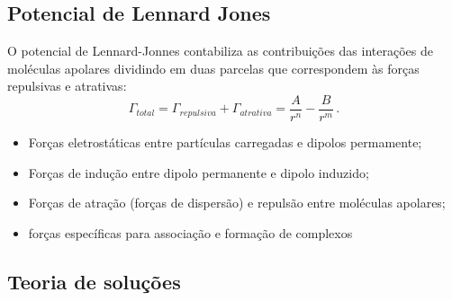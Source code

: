 \documentclass{beamer}
\begin{document}
\subsection{Potencial de Lennard Jones}
\begin{frame}
O potencial de Lennard-Jonnes contabiliza as contribuições das interações de moléculas 
apolares dividindo em duas parcelas que correspondem às forças repulsivas e atrativas: 
\begin{equation}
	\Gamma_{total} = \Gamma_{repulsiva} + \Gamma_{atrativa} = \frac{A}{r^n} - \frac{B}{r^m}\,.
\end{equation}
	\begin{itemize}
	\item Forças eletrostáticas entre partículas carregadas e dipolos permamente; 
	\item Forças de indução entre dipolo permanente e dipolo induzido;
	\item Forças de atração (forças de dispersão) e repulsão entre moléculas apolares;
	\item forças específicas para associação e formação de complexos
	\end{itemize}
\end{frame}

%
%
%
%
%

\subsection{Teoria de soluções}

\end{document}
